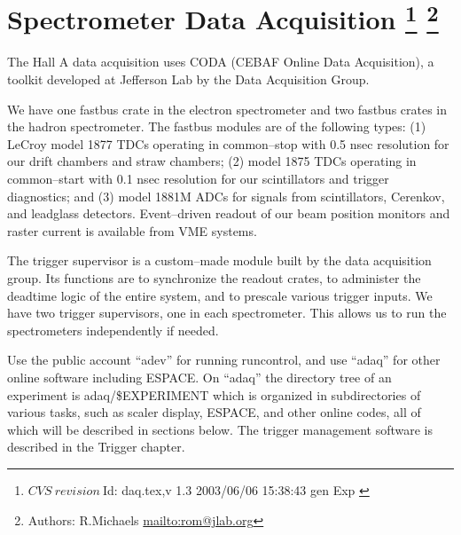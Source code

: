 \section[Spectrometer Data Acquisition]{Spectrometer Data Acquisition
\footnote{
  $CVS~revision~ $Id: daq.tex,v 1.3 2003/06/06 15:38:43 gen Exp $ $
}
\footnote{Authors: R.Michaels \url{mailto:rom@jlab.org}}
}






\par
The Hall A data acquisition uses CODA\cite{CODAwww}
(CEBAF Online Data Acquisition), a toolkit
developed at Jefferson Lab by the Data
Acquisition Group.  

\par
We have one fastbus crate in the
electron spectrometer and two fastbus
crates in the hadron spectrometer.
The fastbus modules are of the following
types:
(1) LeCroy model
1877 TDCs operating in common--stop with 0.5 nsec
resolution for our drift chambers and
straw chambers; (2) model 1875 TDCs
operating in common--start with 0.1 nsec resolution
for our scintillators and trigger 
diagnostics; and (3) model 1881M ADCs
for signals from scintillators, 
Cerenkov, and leadglass detectors.
Event--driven readout of our beam position
monitors and raster current is
available from VME systems.

\par
The trigger supervisor is a custom--made
module built by the data
acquisition group.  Its functions are to
synchronize the readout crates, to administer
the deadtime logic of the entire system, and
to prescale various trigger inputs.  
We have two trigger supervisors,
one in each spectrometer.  This allows us to
run the spectrometers independently if needed.

\par
Use the public account ``adev''
for running runcontrol, and use ``adaq''
for other online software including ESPACE.
On ``adaq'' the directory
tree of an experiment is adaq/\$EXPERIMENT
which is organized in subdirectories of 
various tasks, such as scaler display,
ESPACE, and other online codes, all of
which will be described in sections below.
The trigger management software is described in
the Trigger chapter. 

